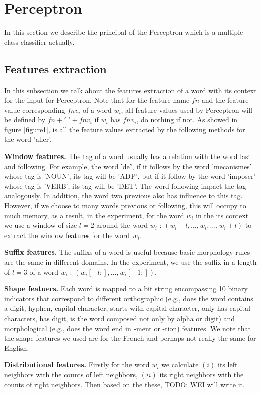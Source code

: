 \documentclass{article}
\begin{document}
\section{Perceptron}
In this section we describe the principal of the Perceptron which is a multiple class classifier actually.

\subsection{Features extraction}
In this subsection we talk about the features extraction of a word with its context for the input for Perceptron. Note that for the feature name $fn$ and  the feature value corresponding $fnv_i$ of a word $w_i$, all feature values used by Perceptron will be defined by $fn + '\_' + fnv_i$ if $w_i$ has $fnv_i$, do nothing if not. As showed in figure \ref{figure1}, is all the feature values extracted by the following methods for the word 'aller'.

\textbf{Window features.} The tag of a word usually has a relation with the word last and following. For example, the word 'de', if it follows by the word 'mecanismes' whose tag is 'NOUN', its tag will be 'ADP', but if it follow by the word 'imposer' whose tag is 'VERB', its tag will be 'DET'. The word following impact the tag analogously. In addition, the word two previous also has influence to this tag. However, if we choose to many words previous or following, this will occupy to much memory, as a result, in the experiment, for the word $w_i$ in the its context we use a window of size $l = 2$ around the word $w_i$ : $(w_i-l,\dots, w_i,\dots, w_i+l )$ to extract the window features for the word $w_i$.

\textbf{Suffix features.} The suffixs of a word is useful because basic morphology rules are the same in different domains. In the experiment, we use the suffix in a length of $l = 3$ of a word $w_i$ : $(w_i[-l:],\dots,w_i[-1:])$. 

\textbf{Shape featuers.} Each word is mapped to a bit string encompassing 10 binary indicators that correspond to different orthographic (e.g., does the word contains a digit, hyphen, capital character, starts with capital character, only has capital characters, has digit, is the word composed not only by alpha or digit) and morphological (e.g., does the word end in -ment or -tion) features. We note that the shape features we used are for the French and perhaps not really the same for English. 

\textbf{Distributional features.} Firstly for the word $w_i$ we calculate $(i)$ its left neighbors with the counts of left neighbors, $(ii)$ its right neighbors with the counts of right neighbors. Then based on the these, TODO: WEI will write it.
\end{document}
